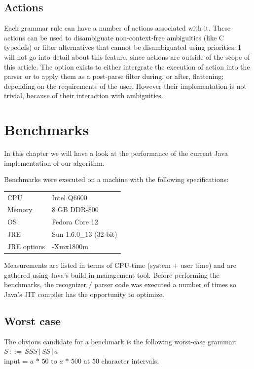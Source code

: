 \documentclass[a4paper,10pt]{article}
\begin{document}
\subsection{Actions}

Each grammar rule can have a number of actions associated with it. These actions can be used to disambiguate non-context-free ambiguities (like C typedefs) or filter alternatives that cannot be disambiguated using priorities. I will not go into detail about this feature, since actions are outside of the scope of this article. The option exists to either intergrate the execution of action into the parser or to apply them as a post-parse filter during, or after, flattening; depending on the requirements of the user. However their implementation is not trivial, because of their interaction with ambiguities.

\section{Benchmarks}

In this chapter we will have a look at the performance of the current Java implementation of our algorithm.

Benchmarks were executed on a machine with the following specifications:
\begin{table}[H]
\centering
\begin{tabular}{ | p{6em} | p{9em} | }
 \hline
 CPU & Intel Q6600 \\
 Memory & 8 GB DDR-800 \\
 OS & Fedora Core 12 \\
 JRE & Sun 1.6.0\_13 (32-bit) \\
 JRE options & -Xmx1800m \\
 \hline
\end{tabular}
\end{table}

Measurements are listed in terms of CPU-time (system + user time) and are gathered using Java's build in management tool. Before performing the benchmarks, the recognizer / parser code was executed a number of times so Java's JIT compiler has the opportunity to optimize.

\subsection{Worst case}

The obvious candidate for a benchmark is the following worst-case grammar:
$S\,::=\,SSS\,|\,SS\,|\,a$\\
input = $a\,*\,50$ to $a\,*\,500$ at $50$ character intervals.
\end{document}
